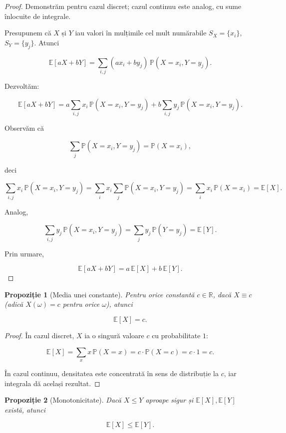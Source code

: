 \documentclass[12pt]{article}
\theoremstyle{plain}
\newtheorem{proposition}{Propoziție}
\begin{document}
\begin{proof}
Demonstrăm pentru cazul discret; cazul continuu este analog, cu sume înlocuite de integrale.

Presupunem că $X$ și $Y$ iau valori în mulțimile cel mult numărabile
$S_X = \{x_i\}$, $S_Y = \{y_j\}$.
Atunci


\[
\mathbb{E}[aX + bY]
= \sum_{i,j} (a x_i + b y_j)\, \mathbb{P}(X = x_i, Y = y_j).
\]


Dezvoltăm:


\[
\mathbb{E}[aX + bY]
= a \sum_{i,j} x_i\, \mathbb{P}(X = x_i, Y = y_j)
+ b \sum_{i,j} y_j\, \mathbb{P}(X = x_i, Y = y_j).
\]


Observăm că


\[
\sum_{j} \mathbb{P}(X = x_i, Y = y_j) = \mathbb{P}(X = x_i),
\]


deci


\[
\sum_{i,j} x_i\, \mathbb{P}(X = x_i, Y = y_j)
= \sum_i x_i \sum_j \mathbb{P}(X = x_i, Y = y_j)
= \sum_i x_i\, \mathbb{P}(X = x_i)
= \mathbb{E}[X].
\]


Analog,


\[
\sum_{i,j} y_j\, \mathbb{P}(X = x_i, Y = y_j)
= \sum_j y_j\, \mathbb{P}(Y = y_j)
= \mathbb{E}[Y].
\]


Prin urmare,


\[
\mathbb{E}[aX + bY] = a\,\mathbb{E}[X] + b\,\mathbb{E}[Y].
\]


\end{proof}

\begin{proposition}[Media unei constante]
Pentru orice constantă $c\in\mathbb{R}$, dacă $X \equiv c$ (adică $X(\omega)=c$ pentru orice $\omega$),
atunci


\[
\mathbb{E}[X] = c.
\]


\end{proposition}

\begin{proof}
În cazul discret, $X$ ia o singură valoare $c$ cu probabilitate $1$:


\[
\mathbb{E}[X] = \sum_x x\,\mathbb{P}(X=x) = c\cdot \mathbb{P}(X=c) = c\cdot 1 = c.
\]


În cazul continuu, densitatea este concentrată în sens de distribuție la $c$, iar integrala dă același rezultat.
\end{proof}

\begin{proposition}[Monotonicitate]
Dacă $X\le Y$ aproape sigur și $\mathbb{E}[X],\mathbb{E}[Y]$ există, atunci


\[
\mathbb{E}[X] \le \mathbb{E}[Y].
\]


\end{proposition}
\end{document}
